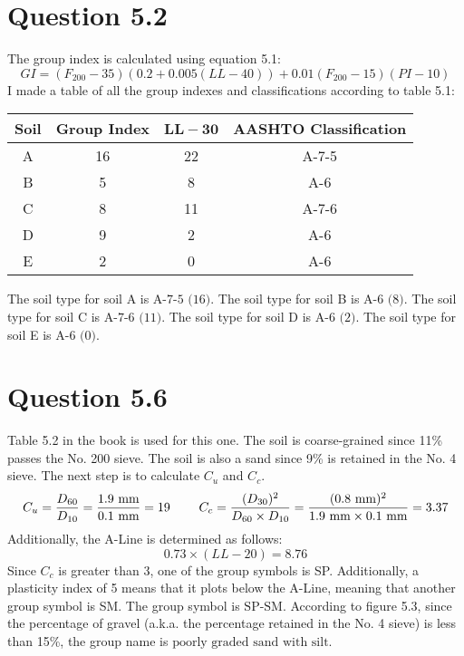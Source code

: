 \documentclass{article}
\begin{document}
\section*{Question 5.2}
The group index is calculated using equation 5.1: 
\[GI=(F_{200}-35)(0.2+0.005(LL-40))+0.01(F_{200}-15)(PI-10)\] 
I made a table of all the group indexes and classifications according to table 5.1: 
\begin{center}
\begin{tabular}{|cccc|}
    \hline
    \textbf{Soil} & \textbf{Group Index} & $\bm{LL-30}$ & \textbf{AASHTO Classification} \\\hline
    A&16	&22	&A-7-5\\
    B&5	&8	&A-6\\
    C&8	&11	&A-7-6\\
    D&9	&2	&A-6\\
    E&2	&0	&A-6\\\hline
\end{tabular}
\end{center}
The soil type for soil A is $\boxed{\text{A-7-5 (16)}}$. The soil type for soil B is $\boxed{\text{A-6 (8)}}$. The soil type for soil C is $\boxed{\text{A-7-6 (11)}}$. The soil type for soil D is $\boxed{\text{A-6 (2)}}$. The soil type for soil E is $\boxed{\text{A-6 (0)}}$.
\section*{Question 5.6} 
Table 5.2 in the book is used for this one. The soil is coarse-grained since 11\% passes the No. 200 sieve. The soil is also a sand since 9\% is retained in the No. 4 sieve. The next step is to calculate $C_u$ and $C_c$.
\[C_u=\frac{D_{60}}{D_{10}}=\frac{1.9\text{ mm}}{0.1\text{ mm}}=19\hspace{8mm}C_c=\frac{(D_{30})^2}{D_{60}\times D_{10}}=\frac{(0.8\text{ mm})^2}{1.9\text{ mm}\times 0.1\text{ mm}}=3.37\]
Additionally, the A-Line is determined as follows: 
\[0.73\times (LL-20)=8.76\] 
Since $C_c$ is greater than 3, one of the group symbols is SP. Additionally, a plasticity index of 5 means that it plots below the A-Line, meaning that another group symbol is SM. The group symbol is $\boxed{\text{SP-SM}}$. According to figure 5.3, since the percentage of gravel (a.k.a. the percentage retained in the No. 4 sieve) is less than 15\%, the group name is $\boxed{\text{poorly graded sand with silt}}$.
\end{document}
